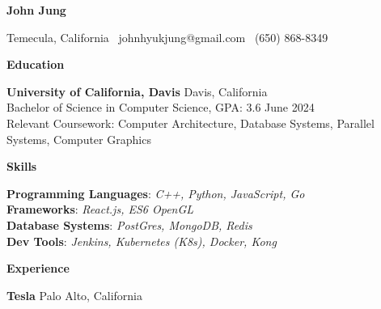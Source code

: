 \documentclass[11pt]{article}
\begin{document}
\begin{center}
    {\huge \textbf{John Jung}}\\ 
\end{center}

\begin{center}
    Temecula, California \textbullet \ johnhyukjung@gmail.com \textbullet \ (650) 868-8349 \\ 
    \hrulefill
\end{center}


\begin{center}
    \textbf{Education}
\end{center}
\textbf{University of California, Davis} \hfill Davis, California\\
Bachelor of Science in Computer Science, GPA: 3.6 \hfill June 2024\\
Relevant Coursework: Computer Architecture, Database Systems, Parallel Systems, Computer Graphics
\vspace{8pt}


\begin{center}
    \textbf{Skills}
\end{center}

\textbf{Programming Languages}: \textit{C++, Python, JavaScript, Go}\\
\textbf{Frameworks}: \textit{React.js, ES6 OpenGL}\\
\textbf{Database Systems}: \textit{PostGres, MongoDB, Redis}\\
\textbf{Dev Tools}: \textit{Jenkins, Kubernetes (K8s), Docker, Kong}

\begin{center}
    \textbf{Experience}
\end{center}
\textbf{Tesla} \hfill Palo Alto, California
\end{document}
